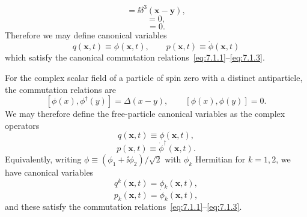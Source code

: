 \begin{equation}
[\phi(\mathbf{x},t),\dot\phi(\mathbf{y},t)]
=\ii\delta^3(\mathbf{x}-\mathbf{y}),
\tag{7.1.4}\label{eq:7.1.4}
\end{equation}
\begin{equation}
[\phi(\mathbf{x},t),\phi(\mathbf{y},t)]=0,
\tag{7.1.5}\label{eq:7.1.5}
\end{equation}
\begin{equation}
[\dot\phi(\mathbf{x},t),\dot\phi(\mathbf{y},t)]=0.
\tag{7.1.6}\label{eq:7.1.6}
\end{equation}
Therefore we may define canonical variables
\begin{equation}
q(\mathbf{x},t)\equiv\phi(\mathbf{x},t),
\qquad
p(\mathbf{x},t)\equiv\dot\phi(\mathbf{x},t)
\tag{7.1.7}\label{eq:7.1.7}
\end{equation}
which satisfy the canonical commutation relations~\eqref{eq:7.1.1}--\eqref{eq:7.1.3}.

For the complex scalar field of a particle of spin zero with a distinct
antiparticle, the commutation relations are
\[
[\phi(x),\phi^\dagger(y)]=\Delta(x-y),
\qquad
[\phi(x),\phi(y)]=0.
\]
We may therefore define the free-particle canonical variables as the complex
operators
\begin{equation}
q(\mathbf{x},t)\equiv\phi(\mathbf{x},t),
\tag{7.1.8}\label{eq:7.1.8}
\end{equation}
\begin{equation}
p(\mathbf{x},t)\equiv\dot\phi^\dagger(\mathbf{x},t).
\tag{7.1.9}\label{eq:7.1.9}
\end{equation}
Equivalently, writing $\phi\equiv(\phi_1+\ii\phi_2)/\sqrt{2}$ with $\phi_k$ Hermitian for
$k=1,2$, we have canonical variables
\begin{equation}
q^k(\mathbf{x},t)=\phi_k(\mathbf{x},t),
\tag{7.1.10}\label{eq:7.1.10}
\end{equation}
\begin{equation}
p_k(\mathbf{x},t)=\dot\phi_k(\mathbf{x},t),
\tag{7.1.11}\label{eq:7.1.11}
\end{equation}
and these satisfy the commutation relations~\eqref{eq:7.1.1}--\eqref{eq:7.1.3}.

